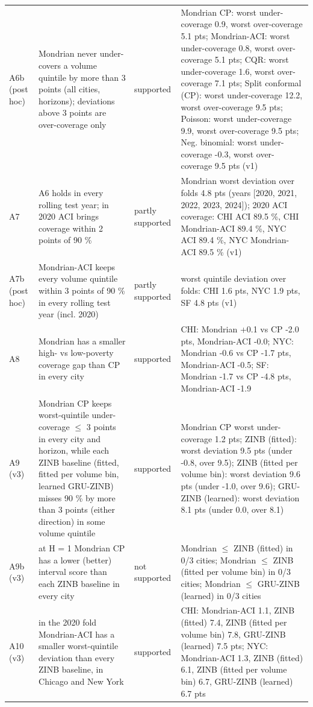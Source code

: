 \documentclass[11pt]{article}
\begin{document}
\begin{table}[H]
\begin{tabularx}{\linewidth}{>{\raggedright\arraybackslash}p{1.6cm}>{\raggedright\arraybackslash}X>{\raggedright\arraybackslash}p{1.7cm}>{\raggedright\arraybackslash}X}
A6b (post hoc) & Mondrian never under-covers a volume quintile by more than 3 points (all cities, horizons); deviations above 3 points are over-coverage only & supported & Mondrian CP: worst under-coverage 0.9, worst over-coverage 5.1 pts; Mondrian-ACI: worst under-coverage 0.8, worst over-coverage 5.1 pts; CQR: worst under-coverage 1.6, worst over-coverage 7.1 pts; Split conformal (CP): worst under-coverage 12.2, worst over-coverage 9.5 pts; Poisson: worst under-coverage 9.9, worst over-coverage 9.5 pts; Neg. binomial: worst under-coverage -0.3, worst over-coverage 9.5 pts (v1) \\
A7 & A6 holds in every rolling test year; in 2020 ACI brings coverage within 2 points of 90 \% & partly supported & Mondrian worst deviation over folds 4.8 pts (years [2020, 2021, 2022, 2023, 2024]); 2020 ACI coverage: CHI ACI 89.5 \%, CHI Mondrian-ACI 89.4 \%, NYC ACI 89.4 \%, NYC Mondrian-ACI 89.5 \% (v1) \\
A7b (post hoc) & Mondrian-ACI keeps every volume quintile within 3 points of 90 \% in every rolling test year (incl. 2020) & partly supported & worst quintile deviation over folds: CHI 1.6 pts, NYC 1.9 pts, SF 4.8 pts (v1) \\
A8 & Mondrian has a smaller high- vs low-poverty coverage gap than CP in every city & supported & CHI: Mondrian +0.1 vs CP -2.0 pts, Mondrian-ACI -0.0; NYC: Mondrian -0.6 vs CP -1.7 pts, Mondrian-ACI -0.5; SF: Mondrian -1.7 vs CP -4.8 pts, Mondrian-ACI -1.9 \\
A9 (v3) & Mondrian CP keeps worst-quintile under-coverage $\leq$ 3 points in every city and horizon, while each ZINB baseline (fitted, fitted per volume bin, learned GRU-ZINB) misses 90 \% by more than 3 points (either direction) in some volume quintile & supported & Mondrian CP worst under-coverage 1.2 pts; ZINB (fitted): worst deviation 9.5 pts (under -0.8, over 9.5); ZINB (fitted per volume bin): worst deviation 9.6 pts (under -1.0, over 9.6); GRU-ZINB (learned): worst deviation 8.1 pts (under 0.0, over 8.1) \\
A9b (v3) & at H = 1 Mondrian CP has a lower (better) interval score than each ZINB baseline in every city & not supported & Mondrian $\leq$ ZINB (fitted) in 0/3 cities; Mondrian $\leq$ ZINB (fitted per volume bin) in 0/3 cities; Mondrian $\leq$ GRU-ZINB (learned) in 0/3 cities \\
A10 (v3) & in the 2020 fold Mondrian-ACI has a smaller worst-quintile deviation than every ZINB baseline, in Chicago and New York & supported & CHI: Mondrian-ACI 1.1, ZINB (fitted) 7.4, ZINB (fitted per volume bin) 7.8, GRU-ZINB (learned) 7.5 pts; NYC: Mondrian-ACI 1.3, ZINB (fitted) 6.1, ZINB (fitted per volume bin) 6.7, GRU-ZINB (learned) 6.7 pts \\

\end{tabularx}
\end{table}
\end{document}
